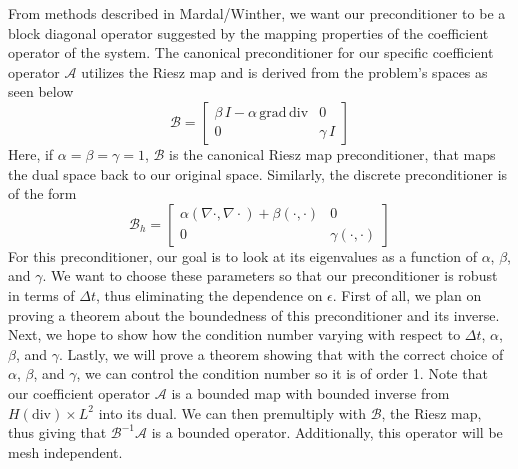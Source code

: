 \documentclass[11pt]{article}
\newcommand{\divv}{\mathrm{div}}
\newcommand{\gradd}{\mathrm{grad}}
\begin{document}
From methods described in Mardal/Winther, we want our preconditioner to be a block diagonal operator suggested by the mapping properties of the coefficient operator of the system. The canonical preconditioner for our specific coefficient operator $\mathscr{A}$ utilizes the Riesz map and is derived from the problem's spaces as seen below
\begin{equation}
\mathscr{B}=\begin{bmatrix}
 \beta\, I -\alpha\,\gradd\,\divv& 0 \\
0 & \gamma\, I
\end{bmatrix}
\end{equation}
Here, if $\alpha = \beta = \gamma = 1$, $\mathscr{B}$ is the canonical Riesz map preconditioner, that maps the dual space back to our original space. %
Similarly, the discrete preconditioner is of the form
\begin{equation}
\mathscr{B}_h=\begin{bmatrix}
\alpha(\nabla \cdot, \nabla \cdot) + \beta(\cdot,\cdot) & 0 \\
0 & \gamma(\cdot, \cdot)
\end{bmatrix}
\end{equation}
For this preconditioner, our goal is to look at its eigenvalues as a function of $\alpha$, $\beta$, and $\gamma$. We want to choose these parameters so that our preconditioner is robust in terms of $\Delta t$, thus eliminating the dependence on $\epsilon$. First of all, we plan on proving a theorem about the boundedness of this preconditioner and its inverse. Next, we hope to show how the condition number varying with respect to $\Delta t$, $\alpha$, $\beta$, and $\gamma$. Lastly, we will prove a theorem showing that with the correct choice of $\alpha$, $\beta$, and $\gamma$, we can control the condition number so it is of order 1.
Note that our coefficient operator $\mathscr{A}$  is a bounded map with bounded inverse from $H(\divv) \times L^2$ into its dual. We can then premultiply with $\mathscr{B}$, the Riesz map, thus giving  that $\mathscr{B}^{-1}\mathscr{A}$ is a bounded operator. Additionally, this operator will be mesh independent.
\end{document}
